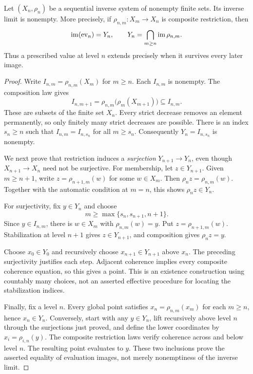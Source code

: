 \begin{KSproposition}\label{KS:KS58}
Let \((X_n,\rho_n)\) be a sequential inverse system of nonempty finite sets. Its inverse limit is nonempty. More precisely, if \(\rho_{n,m}:X_m\to X_n\) is composite restriction, then
\[
 \operatorname{im}(\operatorname{ev}_n)=Y_n,
 \qquad Y_n=\bigcap_{m\ge n}\operatorname{im}\rho_{n,m}.
\]
Thus a prescribed value at level \(n\) extends precisely when it survives every later image.
\end{KSproposition}
\begin{proof}
Write \(I_{n,m}=\rho_{n,m}(X_m)\) for \(m\ge n\). Each \(I_{n,m}\) is nonempty. The composition law gives
\[
 I_{n,m+1}=\rho_{n,m}\bigl(\rho_m(X_{m+1})\bigr)\subseteq I_{n,m}.
\]
These are subsets of the finite set \(X_n\). Every strict decrease removes an element permanently, so only finitely many strict decreases are possible. There is an index \(s_n\ge n\) such that \(I_{n,m}=I_{n,s_n}\) for all \(m\ge s_n\). Consequently \(Y_n=I_{n,s_n}\) is nonempty.

We next prove that restriction induces a \emph{surjection} \(Y_{n+1}\to Y_n\), even though \(X_{n+1}\to X_n\) need not be surjective. For membership, let \(z\in Y_{n+1}\). Given \(m\ge n+1\), write \(z=\rho_{n+1,m}(w)\) for some \(w\in X_m\). Then \(\rho_n z=\rho_{n,m}(w)\). Together with the automatic condition at \(m=n\), this shows \(\rho_nz\in Y_n\).

For surjectivity, fix \(y\in Y_n\) and choose
\[
 m\ge\max\{s_n,s_{n+1},n+1\}.
\]
Since \(y\in I_{n,m}\), there is \(w\in X_m\) with \(\rho_{n,m}(w)=y\). Put \(z=\rho_{n+1,m}(w)\). Stabilization at level \(n+1\) gives \(z\in Y_{n+1}\), and composition gives \(\rho_nz=y\).

Choose \(x_0\in Y_0\) and recursively choose \(x_{n+1}\in Y_{n+1}\) above \(x_n\). The preceding surjectivity justifies each step. Adjacent coherence implies every composite coherence equation, so this gives a point. This is an existence construction using countably many choices, not an asserted effective procedure for locating the stabilization indices.

Finally, fix a level \(n\). Every global point satisfies \(x_n=\rho_{n,m}(x_m)\) for each \(m\ge n\), hence \(x_n\in Y_n\). Conversely, start with any \(y\in Y_n\), lift recursively above level \(n\) through the surjections just proved, and define the lower coordinates by \(x_i=\rho_{i,n}(y)\). The composite restriction laws verify coherence across and below level \(n\). The resulting point evaluates to \(y\). These two inclusions prove the asserted equality of evaluation images, not merely nonemptiness of the inverse limit.
\end{proof}
